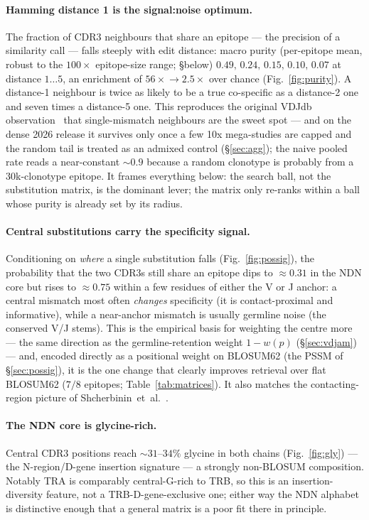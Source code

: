 \documentclass[11pt]{article}
\theoremstyle{oldplain}
\theoremstyle{oldrem}
\begin{document}
\paragraph{Hamming distance 1 is the signal:noise optimum.} The fraction of CDR3 neighbours that share
an epitope --- the precision of a similarity call --- falls steeply with edit distance: macro purity
(per-epitope mean, robust to the $100\times$ epitope-size range; \S below) $0.49,\,0.24,\,0.15,\,0.10,
\,0.07$ at distance $1\ldots5$, an enrichment of $56\times\!\to\!2.5\times$ over chance
(Fig.~\ref{fig:purity}). A distance-1 neighbour is twice as likely to be a true co-specific as a
distance-2 one and seven times a distance-5 one. This reproduces the original VDJdb
observation~\cite{Shugay2018} that single-mismatch neighbours are the sweet spot --- and on the dense
2026 release it survives only once a few 10x mega-studies are capped and the random tail is treated as
an admixed control (\S\ref{sec:agg}); the naive pooled rate reads a near-constant $\sim$$0.9$ because a
random clonotype is probably from a $30$k-clonotype epitope. It frames everything below: the search
ball, not the substitution matrix, is the dominant lever; the matrix only re-ranks within a ball whose
purity is already set by its radius.

\paragraph{Central substitutions carry the specificity signal.} Conditioning on \emph{where} a single
substitution falls (Fig.~\ref{fig:possig}), the probability that the two CDR3s still share an epitope
dips to $\approx0.31$ in the NDN core but rises to $\approx0.75$ within a few residues of either the V
or J anchor: a central mismatch most often \emph{changes} specificity (it is contact-proximal and
informative), while a near-anchor mismatch is usually germline noise (the conserved V/J stems). This is the empirical basis for
weighting the centre more --- the same direction as the germline-retention weight $1-w(p)$
(\S\ref{sec:vdjam}) --- and, encoded directly as a positional weight on BLOSUM62 (the PSSM of
\S\ref{sec:possig}), it is the one change that clearly improves retrieval over flat BLOSUM62 ($7/8$
epitopes; Table~\ref{tab:matrices}). It also matches the contacting-region picture of
Shcherbinin~et~al.~\cite{Shcherbinin2023}.

\paragraph{The NDN core is glycine-rich.} Central CDR3 positions reach $\sim31$--$34\%$ glycine in
both chains (Fig.~\ref{fig:gly}) --- the N-region/D-gene insertion signature --- a strongly
non-BLOSUM composition. Notably TRA is comparably central-G-rich to TRB, so this is an
insertion-diversity feature, not a TRB-D-gene-exclusive one; either way the NDN alphabet is distinctive
enough that a general matrix is a poor fit there in principle.
\end{document}
